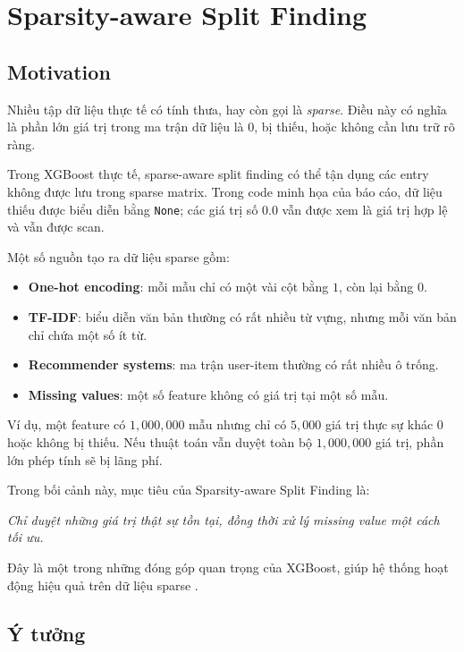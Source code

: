 \section{Sparsity-aware Split Finding}

\subsection{Motivation}

Nhiều tập dữ liệu thực tế có tính thưa, hay còn gọi là \textit{sparse}. Điều này có nghĩa là phần lớn giá trị trong ma trận dữ liệu là $0$, bị thiếu, hoặc không cần lưu trữ rõ ràng.

Trong XGBoost thực tế, sparse-aware split finding có thể tận dụng các entry không được lưu trong sparse matrix. Trong code minh họa của báo cáo, dữ liệu thiếu được biểu diễn bằng \texttt{None}; các giá trị số $0.0$ vẫn được xem là giá trị hợp lệ và vẫn được scan.

Một số nguồn tạo ra dữ liệu sparse gồm:

\begin{itemize}
    \item \textbf{One-hot encoding}: mỗi mẫu chỉ có một vài cột bằng $1$, còn lại bằng $0$.
    \item \textbf{TF-IDF}: biểu diễn văn bản thường có rất nhiều từ vựng, nhưng mỗi văn bản chỉ chứa một số ít từ.
    \item \textbf{Recommender systems}: ma trận user-item thường có rất nhiều ô trống.
    \item \textbf{Missing values}: một số feature không có giá trị tại một số mẫu.
\end{itemize}

Ví dụ, một feature có $1{,}000{,}000$ mẫu nhưng chỉ có $5{,}000$ giá trị thực sự khác $0$ hoặc không bị thiếu. Nếu thuật toán vẫn duyệt toàn bộ $1{,}000{,}000$ giá trị, phần lớn phép tính sẽ bị lãng phí.

Trong bối cảnh này, mục tiêu của Sparsity-aware Split Finding là:

\begin{center}
\textit{Chỉ duyệt những giá trị thật sự tồn tại, đồng thời xử lý missing value một cách tối ưu.}
\end{center}

Đây là một trong những đóng góp quan trọng của XGBoost, giúp hệ thống hoạt động hiệu quả trên dữ liệu sparse \cite{chen2016xgboost}.

\subsection{Ý tưởng}

